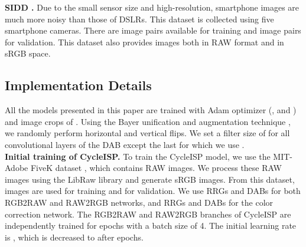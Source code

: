 \documentclass[10pt,twocolumn,letterpaper]{article}
\begin{document}
\vspace{0.4em}\noindent \textbf{SIDD \cite{sidd}.} Due to the small sensor size and high-resolution, smartphone images are much more noisy than those of DSLRs. 
This dataset is collected using five smartphone cameras. 
There are  image pairs available for training and  image pairs for validation. 
This dataset also provides images both in RAW format and in sRGB space.  




\subsection{Implementation Details}
All the models presented in this paper are trained with Adam optimizer (, and ) and image crops of . 
Using the Bayer unification and augmentation technique \cite{liu2019learning}, we randomly perform horizontal and vertical flips. 
We set a filter size of  for all convolutional layers of the DAB except the last for which we use . \vspace{0.4em}\\
\noindent \textbf{Initial training of CycleISP.} To train the CycleISP model, we use the MIT-Adobe FiveK dataset \cite{mit_fivek}, which contains  RAW images. 
We process these RAW images using the LibRaw library and generate sRGB images. 
From this dataset,
 images are used for training and  for validation. 
We use  RRGs and  DABs for both RGB2RAW and RAW2RGB networks, and  RRGs and  DABs for the color correction network. 
The RGB2RAW and RAW2RGB branches of CycleISP are independently trained for  epochs with a batch size of 4. 
The initial learning rate is , which is decreased to  after  epochs. 
\end{document}
